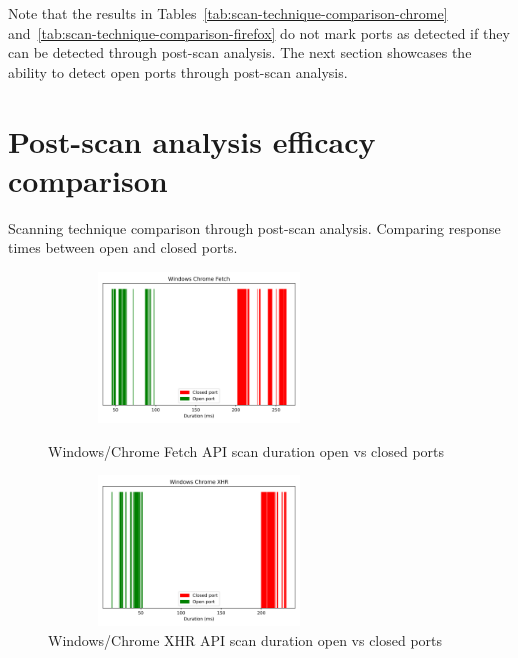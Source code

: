 Note that the results in Tables~\ref{tab:scan-technique-comparison-chrome} and~\ref{tab:scan-technique-comparison-firefox} do not mark ports as detected if they can be detected through post-scan analysis. The next section showcases the ability to detect open ports through post-scan analysis.


\section{Post-scan analysis efficacy comparison}
\label{appendix:scan-duration-comparison}
Scanning technique comparison through post-scan analysis. Comparing response times between open and closed ports.

\begin{figure}[ht]
\centering
\begin{minipage}{.45\textwidth}
  \centering
\includegraphics[width=8cm, height=4cm, keepaspectratio]{port_scanning_techniques/img/windows_chrome_efficacy_fetch.png}
    \caption{Windows/Chrome Fetch API scan duration open vs closed ports}
    \label{fig:win-chrome-fetch}
\end{minipage}
\hspace{0.5cm} %
\begin{minipage}{.45\textwidth}
\includegraphics[width=8cm, height=4cm, keepaspectratio]{port_scanning_techniques/img/windows_chrome_efficacy_xhr.png}
    \caption{Windows/Chrome XHR API scan duration open vs closed ports}
    \label{fig:appendix-win-chrome-xhr}
\end{minipage}
\end{figure}

